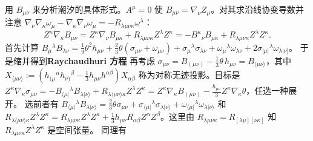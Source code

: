 用 $B_{\mu\nu}$ 来分析潮汐的具体形式。$A^\mu=0$ 使 $B_{\mu\nu}=\nabla_\nu Z_{\mu}$。对其求沿线协变导数并注意 $\nabla_{\nu}\nabla_{\kappa} \omega_\mu - \nabla_{\kappa}\nabla_{\nu} \omega_\mu = - R_{\lambda\mu\nu\kappa} \omega^\lambda$：
\[Z^\kappa \nabla_\kappa B_{\mu\nu} = Z^\kappa \nabla_\nu B_{\mu\kappa} + R_{\lambda\mu\nu\kappa} Z^\lambda Z^\kappa = - B^\kappa{}_\nu B_{\mu\kappa} + R_{\lambda\mu\nu\kappa} Z^\lambda Z^\kappa.\]
首先计算 $B_\mu{}^{\lambda} B_{\lambda\nu}
=\frac19 \theta^2 h_{\mu\nu}
+\frac23 \theta (\sigma_{\mu\nu}+\omega_{\mu\nu})
+\sigma_\mu{}^{\lambda}\sigma_{\lambda\nu}
+\omega_\mu{}^{\lambda}\omega_{\lambda\nu}
+2\sigma_{[\mu|}{}^{\lambda}\omega_{\lambda|\nu]}$。
于是缩并得到\textbf{Raychaudhuri 方程}
再考虑 $\sigma_{\mu\nu} = B_{(\mu\nu)}-\frac{1}{3}\theta\,h_{\mu\nu} = B_{\langle\mu\nu\rangle}$，其中 $X_{\langle\mu\nu\rangle} :=
\left(
h_{(\mu}{}^{\alpha} h_{\nu)}{}^{\beta}
-\frac{1}{3} h_{\mu\nu} h^{\alpha\beta}
\right) X_{\alpha\beta}$ 称为对称无迹投影。目标是 $Z^\kappa \nabla_\kappa \sigma_{\mu\nu}=-B_{\langle\mu|}{}^{\lambda} B_{\lambda|\nu\rangle}+R_{\lambda\langle\mu\nu\rangle\kappa} Z^\lambda Z^\kappa = Z^\kappa \nabla_\kappa B_{(\mu\nu)}-\frac{h_{\mu\nu}}{3}Z^\kappa \nabla_\kappa\theta$，任选一种展开。
选前者有 $B_{\langle\mu|}{}^{\lambda} B_{\lambda|\nu\rangle} = \frac{2}{3}\theta\sigma_{\mu\nu} + \sigma_{\langle\mu|}{}^{\lambda} \sigma_{\lambda|\nu\rangle} + \omega_{\langle\mu|}{}^{\lambda} \omega_{\lambda|\nu\rangle}$ 和 $R_{\lambda\langle\mu\nu\rangle\kappa} Z^\lambda Z^\kappa = R_{\lambda\mu\nu\kappa} Z^\lambda Z^\kappa + \frac13h_{\mu\nu}R_{\alpha\beta}Z^\alpha Z^\beta$。这里由 $R_{\lambda\mu\nu\kappa}=R_{[\lambda\mu][\nu\kappa]}$ 知 $R_{\lambda\mu\nu\kappa} Z^\lambda Z^\kappa$ 是空间张量。
同理有


